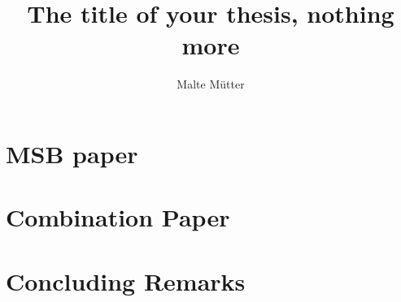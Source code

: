 \documentclass{thesis}
\title{The title of your thesis, nothing more}
\author{Malte Mütter}
\date{} %
\begin{document}
	\frontmatter

  

  \tableofcontents*
  
  
  \mainmatter


  \chapter{MSB paper}

  \chapter{Combination Paper}

  \chapter{Concluding Remarks}
\end{document}
